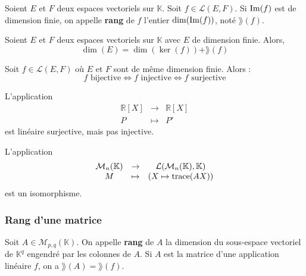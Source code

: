 
	\begin{definition}
		Soient $E$ et $F$ deux espaces vectoriels sur $\mathbb{K}$. Soit $f \in \mathcal{L}(E, F)$. Si $\mathrm{Im}(f)$ est de dimension finie, on appelle \textbf{rang} de $f$ l'entier $\dim(\mathrm{Im}(f))$, noté $\rang (f)$.
	\end{definition}

	\begin{theorem}
		Soient $E$ et $F$ deux espaces vectoriels sur $\mathbb{K}$ avec $E$ de dimension finie. Alors,
		\[ \dim(E) = \dim(\ker (f)) + \rang (f) \]
	\end{theorem}
	
	\begin{corollary}
		Soit $f \in \mathcal{L}(E, F)$ où $E$ et $F$ sont de même dimension finie. Alors :
		\[ f \text{ bijective} \iff f \text{ injective} \iff f \text{ surjective} \]
	\end{corollary}
	
	\begin{cexample}
		L'application
		\[
		\begin{array}{ccc}
			\mathbb{R}[X] &\rightarrow& \mathbb{R}[X] \\
			P &\mapsto& P'
		\end{array}
		\]
		est linéaire surjective, mais pas injective.
	\end{cexample}
	
	
	\begin{application}
		L'application
		\[
		\begin{array}{ccc}
			\mathcal{M}_n(\mathbb{K}) &\rightarrow& \mathcal{L}(\mathcal{M}_n(\mathbb{K}), \mathbb{K}) \\
			M &\mapsto& (X \mapsto \operatorname{trace}(AX))
		\end{array}
		\]
		est un isomorphisme.
	\end{application}

	\subsubsection{Rang d'une matrice}
	

	\begin{definition}
		Soit $A \in \mathcal{M}_{p,q}(\mathbb{K})$. On appelle \textbf{rang} de $A$ la dimension du sous-espace vectoriel de $\mathbb{K}^q$ engendré par les colonnes de $A$. Si $A$ est la matrice d'une application linéaire $f$, on a $\rang (A) = \rang (f)$.
	\end{definition}
	
